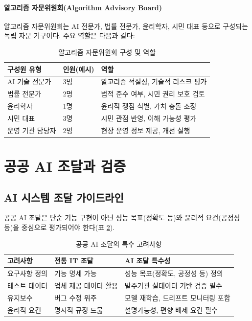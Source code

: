 \paragraph{알고리즘 자문위원회(Algorithm Advisory Board)}

알고리즘 자문위원회는 AI 전문가, 법률 전문가, 윤리학자, 시민 대표 등으로 구성되는 독립 자문 기구이다. 주요 역할은 다음과 같다:

\begin{table}[htbp]
\centering
\caption{알고리즘 자문위원회 구성 및 역할}
\label{tab:18_advisory}
\begin{tabularx}{\textwidth}{p{2.5cm}p{2cm}X}
\toprule
\textbf{구성원 유형} & \textbf{인원(예시)} & \textbf{역할} \\
\midrule
AI 기술 전문가 & 3명 & 알고리즘 적절성, 기술적 리스크 평가 \\
법률 전문가 & 2명 & 법적 준수 여부, 시민 권리 보호 검토 \\
윤리학자 & 1명 & 윤리적 쟁점 식별, 가치 충돌 조정 \\
시민 대표 & 3명 & 시민 관점 반영, 이해 가능성 평가 \\
운영 기관 담당자 & 2명 & 현장 운영 정보 제공, 개선 실행 \\
\bottomrule
\end{tabularx}
\end{table}

\section{공공 AI 조달과 검증}
\label{sec:18.3}

\subsection{AI 시스템 조달 가이드라인}
\label{sec:18.3.1}

공공 AI 조달은 단순 기능 구현이 아닌 성능 목표(정확도 등)와 윤리적 요건(공정성 등)을 중심으로 평가되어야 한다(표 \ref{tab:18_4}).

\begin{table}[htbp]
\centering
\caption{공공 AI 조달의 특수 고려사항}
\label{tab:18_4}
\begin{tabularx}{\textwidth}{p{3cm}Xp{5cm}}
\toprule
\textbf{고려사항} & \textbf{전통 IT 조달} & \textbf{AI 조달 특수성} \\
\midrule
요구사항 정의 & 기능 명세 가능 & 성능 목표(정확도, 공정성 등) 정의 \\
테스트 데이터 & 업체 제공 데이터 활용 & 발주기관 실데이터 기반 검증 필수 \\
유지보수 & 버그 수정 위주 & 모델 재학습, 드리프트 모니터링 포함 \\
윤리적 요건 & 명시적 규정 드묾 & 설명가능성, 편향 배제 요건 필수 \\
\bottomrule
\end{tabularx}
\end{table}

